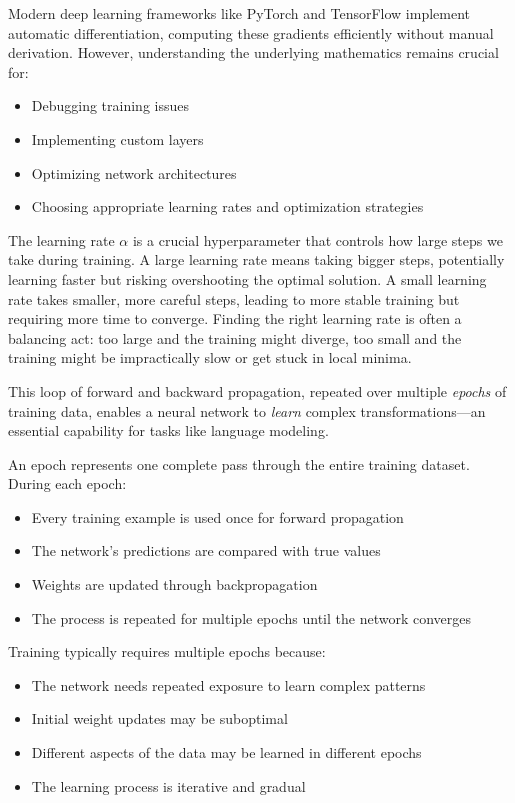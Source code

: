 \begin{itemize}
    Modern deep learning frameworks like PyTorch and TensorFlow implement automatic differentiation, computing these gradients efficiently without manual derivation. However, understanding the underlying mathematics remains crucial for:
    \begin{itemize}
        \item Debugging training issues
        \item Implementing custom layers
        \item Optimizing network architectures
        \item Choosing appropriate learning rates and optimization strategies
    \end{itemize}


    The learning rate $\alpha$ is a crucial hyperparameter that controls how large steps we take during training. A large learning rate means taking bigger steps, potentially learning faster but risking overshooting the optimal solution. A small learning rate takes smaller, more careful steps, leading to more stable training but requiring more time to converge. Finding the right learning rate is often a balancing act: too large and the training might diverge, too small and the training might be impractically slow or get stuck in local minima.
\end{itemize}


This loop of forward and backward propagation, repeated over multiple \emph{epochs} of training data, enables a neural network to \emph{learn} complex transformations—an essential capability for tasks like language modeling.

\noindent
An epoch represents one complete pass through the entire training dataset. During each epoch:
\begin{itemize}
    \item Every training example is used once for forward propagation
    \item The network's predictions are compared with true values
    \item Weights are updated through backpropagation
    \item The process is repeated for multiple epochs until the network converges
\end{itemize}

\noindent
Training typically requires multiple epochs because:
\begin{itemize}
    \item The network needs repeated exposure to learn complex patterns
    \item Initial weight updates may be suboptimal
    \item Different aspects of the data may be learned in different epochs
    \item The learning process is iterative and gradual
\end{itemize}

